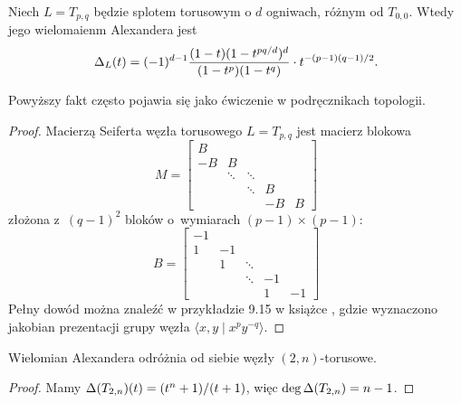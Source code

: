 \begin{proposition}
    Niech $L = T_{p, q}$ będzie splotem torusowym o $d$ ogniwach, różnym od $T_{0, 0}$.
    Wtedy jego wielomaienm Alexandera jest
    \begin{equation}
        \Delta_L(t) = (-1)^{d-1} \frac{(1-t)(1 - t^{pq/d})^d}{(1-t^p)(1-t^q)} \cdot t^{-(p-1)(q-1)/2}.
    \end{equation}
\end{proposition}

Powyższy fakt często pojawia się jako ćwiczenie w podręcznikach topologii.

\begin{proof}
    Macierzą Seiferta węzła torusowego $L = T_{p, q}$ jest macierz blokowa
    \begin{equation}
        M = \begin{bmatrix}
            B & & & & \\
            -B & B & & & \\
            & \ddots & \ddots & & \\
            & & \ddots & B & \\
            & & & -B & B
        \end{bmatrix}
    \end{equation}
    złożona z~$(q-1)^2$ bloków o~wymiarach $(p-1) \times (p-1)$:
    \begin{equation}
        B = \begin{bmatrix}
            -1 & & & & \\
            1 & -1 & & & \\
            & 1 & \ddots & & \\
            & & \ddots & -1 & \\
            & & & 1 & -1
        \end{bmatrix}
    \end{equation}
    Pełny dowód można znaleźć w przykładzie 9.15 w książce \cite{burde03}, gdzie wyznaczono jakobian prezentacji grupy węzła $\langle x, y \mid x^py^{-q}\rangle$.
\end{proof}

\begin{corollary}
    Wielomian Alexandera odróżnia od siebie węzły $(2,n)$-torusowe.
\end{corollary}

\begin{proof}
    Mamy $\Delta(T_{2,n})(t) = (t^n+1) / (t+1)$, więc $\deg \Delta (T_{2,n}) = n - 1$.
\end{proof}

